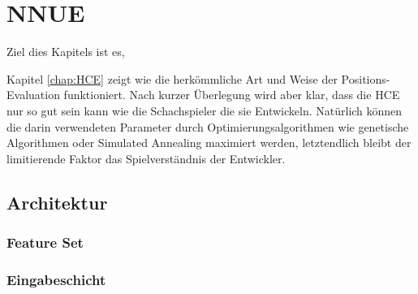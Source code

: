 \chapter{NNUE}

Ziel dies Kapitels ist es, 

Kapitel \autoref{chap:HCE} zeigt wie die herkömmliche Art und Weise der Positions-Evaluation funktioniert. Nach kurzer Überlegung wird aber klar, dass die \ac{HCE} nur so gut sein kann wie die Schachspieler die sie Entwickeln. Natürlich können die darin verwendeten Parameter durch Optimierungsalgorithmen wie genetische Algorithmen oder Simulated Annealing maximiert werden, letztendlich bleibt der limitierende Faktor das Spielverständnis der Entwickler.


\section{Architektur}



\subsection{Feature Set}
\label{chap:featureSet}



\subsection{Eingabeschicht}

